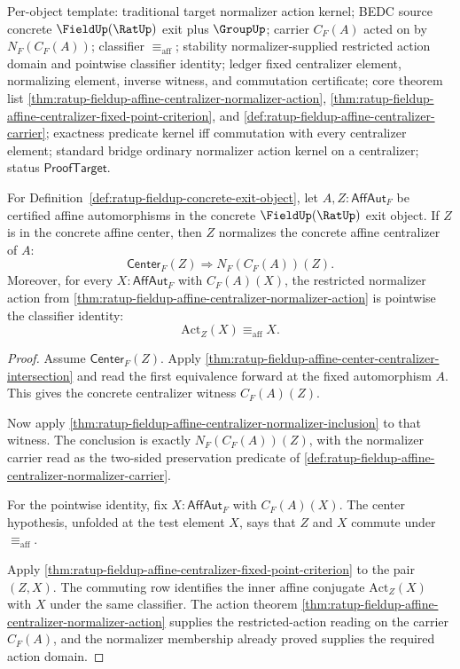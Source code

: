 Per-object template: traditional target normalizer action kernel; BEDC source
concrete $\FieldUp(\RatUp)$ exit plus $\GroupUp$; carrier $C_F(A)$ acted on by
$N_F(C_F(A))$; classifier $\equiv_{\mathrm{aff}}$; stability normalizer-supplied
restricted action domain and pointwise classifier identity; ledger fixed
centralizer element, normalizing element, inverse witness, and commutation
certificate; core theorem list
\autoref{thm:ratup-fieldup-affine-centralizer-normalizer-action},
\autoref{thm:ratup-fieldup-affine-centralizer-fixed-point-criterion}, and
\autoref{def:ratup-fieldup-affine-centralizer-carrier}; exactness predicate
kernel iff commutation with every centralizer element; standard bridge ordinary
normalizer action kernel on a centralizer; status $\mathsf{ProofTarget}$.

\begin{theorem}
\label{thm:ratup-fieldup-affine-center-normalizes-centralizers}
For Definition~\ref{def:ratup-fieldup-concrete-exit-object}, let
$A,Z:\mathsf{AffAut}_F$ be certified affine automorphisms in the concrete
$\FieldUp(\RatUp)$ exit object. If $Z$ is in the concrete affine center, then
$Z$ normalizes the concrete affine centralizer of $A$:
$$
\mathsf{Center}_F(Z)\Rightarrow N_F(C_F(A))(Z).
$$
Moreover, for every $X:\mathsf{AffAut}_F$ with $C_F(A)(X)$, the restricted
normalizer action from
\autoref{thm:ratup-fieldup-affine-centralizer-normalizer-action} is pointwise
the classifier identity:
$$
\mathrm{Act}_Z(X)\equiv_{\mathrm{aff}}X.
$$
\end{theorem}
\begin{proof}
Assume $\mathsf{Center}_F(Z)$. Apply
\autoref{thm:ratup-fieldup-affine-center-centralizer-intersection} and read the
first equivalence forward at the fixed automorphism $A$. This gives the concrete
centralizer witness $C_F(A)(Z)$.

Now apply
\autoref{thm:ratup-fieldup-affine-centralizer-normalizer-inclusion} to that
witness. The conclusion is exactly $N_F(C_F(A))(Z)$, with the normalizer carrier
read as the two-sided preservation predicate of
\autoref{def:ratup-fieldup-affine-centralizer-normalizer-carrier}.

For the pointwise identity, fix $X:\mathsf{AffAut}_F$ with $C_F(A)(X)$. The
center hypothesis, unfolded at the test element $X$, says that $Z$ and $X$
commute under $\equiv_{\mathrm{aff}}$.

Apply
\autoref{thm:ratup-fieldup-affine-centralizer-fixed-point-criterion} to the pair
$(Z,X)$. The commuting row identifies the inner affine conjugate
$\mathrm{Act}_Z(X)$ with $X$ under the same classifier. The action theorem
\autoref{thm:ratup-fieldup-affine-centralizer-normalizer-action} supplies the
restricted-action reading on the carrier $C_F(A)$, and the normalizer membership
already proved supplies the required action domain.
\end{proof}

